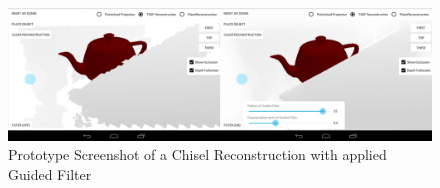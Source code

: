 \documentclass[12pt]{support/thcolognereport}
\begin{document}
\begin{figure}[h]
  \centering
	\includegraphics[width=1.0\textwidth]{content/images/implementation/filter-demo.png} 
  \caption{Prototype Screenshot of a Chisel Reconstruction with applied Guided Filter}
  \label{fig:filter-demo}
\end{figure}

\setlength{\parskip}{0em}



 
\end{document}
